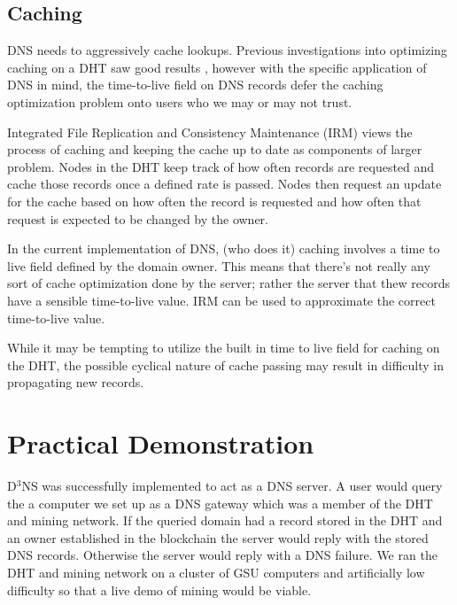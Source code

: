 \documentclass[11pt]{IEEEtran} %
\begin{document}
\subsection{Caching}
DNS needs to aggressively cache lookups. Previous investigations into optimizing caching on a DHT saw good results \cite{irm}, however with the specific application of DNS in mind, the time-to-live field on DNS records defer the caching optimization problem onto users who we may or may not trust.

Integrated File Replication and Consistency Maintenance (IRM) \cite{irm} views the process of caching and keeping the cache up to date as components of larger problem.  Nodes in the DHT keep track of how often records are requested and cache those records once a defined rate is passed.  Nodes then request an update for the cache based on how often the record is requested and how often that request is expected to be changed by the owner.


In the current implementation of DNS, (who does it) caching involves a time to live field defined by the domain owner. This means that there's not really any sort of cache optimization done by the server; rather the server that thew records have a sensible time-to-live value. IRM \cite{irm}  can be used to approximate the correct time-to-live value.

While it may be tempting to utilize the built in time to live field for caching on the DHT, the possible cyclical nature of cache passing may result in difficulty in propagating new records.

\section{Practical Demonstration}
D$^3$NS was successfully implemented to act as a DNS server.  A user would query the a computer we set up as a DNS gateway which was a member of the DHT and mining network. If the queried domain had a record stored in the DHT and an owner established in the blockchain the server would reply with the stored DNS records. Otherwise the server would reply with a DNS failure. We ran the DHT and mining network on a cluster of GSU computers and artificially low difficulty so that a live demo of mining would be viable.
\end{document}
